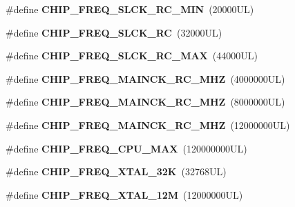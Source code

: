 \begin{DoxyCompactItemize}
\#define {\bfseries C\+H\+I\+P\+\_\+\+F\+R\+E\+Q\+\_\+\+S\+L\+C\+K\+\_\+\+R\+C\+\_\+\+M\+IN}~(20000\+U\+L)
\item 
\mbox{\label{group__SAME70Q21__definitions_ga3de2f058a0254e9b117154f849ada7cc}} 
\#define {\bfseries C\+H\+I\+P\+\_\+\+F\+R\+E\+Q\+\_\+\+S\+L\+C\+K\+\_\+\+RC}~(32000\+U\+L)
\item 
\mbox{\label{group__SAME70Q21__definitions_gaecd36c2831859a2de64e3dfcb753e8b2}} 
\#define {\bfseries C\+H\+I\+P\+\_\+\+F\+R\+E\+Q\+\_\+\+S\+L\+C\+K\+\_\+\+R\+C\+\_\+\+M\+AX}~(44000\+U\+L)
\item 
\mbox{\label{group__SAME70Q21__definitions_gaa86cfccba0dc1e84357cc7613e25886f}} 
\#define {\bfseries C\+H\+I\+P\+\_\+\+F\+R\+E\+Q\+\_\+\+M\+A\+I\+N\+C\+K\+\_\+\+R\+C\+\_\+M\+HZ}~(4000000\+U\+L)
\item 
\mbox{\label{group__SAME70Q21__definitions_gaa47e66cb0661306ff744015ae138967f}} 
\#define {\bfseries C\+H\+I\+P\+\_\+\+F\+R\+E\+Q\+\_\+\+M\+A\+I\+N\+C\+K\+\_\+\+R\+C\+\_\+M\+HZ}~(8000000\+U\+L)
\item 
\mbox{\label{group__SAME70Q21__definitions_ga2395f8d0e2096afe77da9a88a86bba81}} 
\#define {\bfseries C\+H\+I\+P\+\_\+\+F\+R\+E\+Q\+\_\+\+M\+A\+I\+N\+C\+K\+\_\+\+R\+C\+\_\+M\+HZ}~(12000000\+U\+L)
\item 
\mbox{\label{group__SAME70Q21__definitions_ga715bd749d7d9adf95f2248e77ea244ac}} 
\#define {\bfseries C\+H\+I\+P\+\_\+\+F\+R\+E\+Q\+\_\+\+C\+P\+U\+\_\+\+M\+AX}~(120000000\+U\+L)
\item 
\mbox{\label{group__SAME70Q21__definitions_ga78ec308087884d119d47f4e419bc421c}} 
\#define {\bfseries C\+H\+I\+P\+\_\+\+F\+R\+E\+Q\+\_\+\+X\+T\+A\+L\+\_\+32K}~(32768\+U\+L)
\item 
\mbox{\label{group__SAME70Q21__definitions_ga1760b80c5c7b36ef94de72a49f8f4c46}} 
\#define {\bfseries C\+H\+I\+P\+\_\+\+F\+R\+E\+Q\+\_\+\+X\+T\+A\+L\+\_\+12M}~(12000000\+U\+L)
\item 

\end{DoxyCompactItemize}
